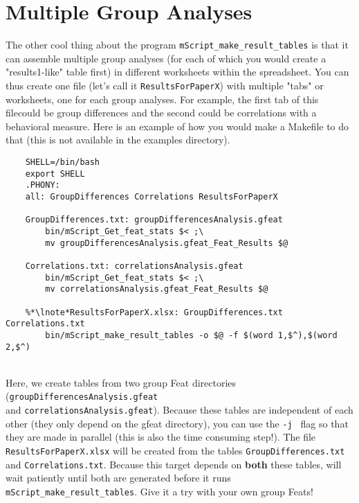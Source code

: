\section{Multiple Group Analyses} 

The other cool thing about the program \texttt{mScript_make_result_tables} is that it can assemble multiple group analyses (for each of which you would create a "results1-like" table first) in different worksheets within the spreadsheet. You can thus create one file (let's call it \texttt{ResultsForPaperX}) with multiple "tabs" or worksheets, one for each group analyses. For example, the first tab of this filecould be group differences and the second could be correlations with a behavioral measure. Here is an example of how you would make a Makefile to do that (this is not available in the examples directory). 

\begin{lstlisting}
	SHELL=/bin/bash
	export SHELL
	.PHONY: 
	all: GroupDifferences Correlations ResultsForPaperX
  
	GroupDifferences.txt: groupDifferencesAnalysis.gfeat
		bin/mScript_Get_feat_stats $< ;\
		mv groupDifferencesAnalysis.gfeat_Feat_Results $@
	
	Correlations.txt: correlationsAnalysis.gfeat
		bin/mScript_Get_feat_stats $< ;\
		mv correlationsAnalysis.gfeat_Feat_Results $@

	%*\lnote*ResultsForPaperX.xlsx: GroupDifferences.txt Correlations.txt
		bin/mScript_make_result_tables -o $@ -f $(word 1,$^),$(word 2,$^)

\end{lstlisting}
\\

\noindent
Here, we create tables from two group Feat directories 
(\texttt{groupDifferencesAnalysis.gfeat} \\
and \texttt{correlationsAnalysis.gfeat}). 
Because these tables are independent of each other (they only depend on the gfeat directory), you can use the \texttt{-j } flag so that they are made in parallel (this is also the time consuming step!). 
\lnum{3} The file \texttt{ResultsForPaperX.xlsx} will be created from the tables \texttt{GroupDifferences.txt} and \texttt{Correlations.txt}. Because this target depends on \textbf{both} these tables, \maken{} will wait patiently until both are generated before it runs \texttt{mScript_make_result_tables}. Give it a try with your own group Feats!






